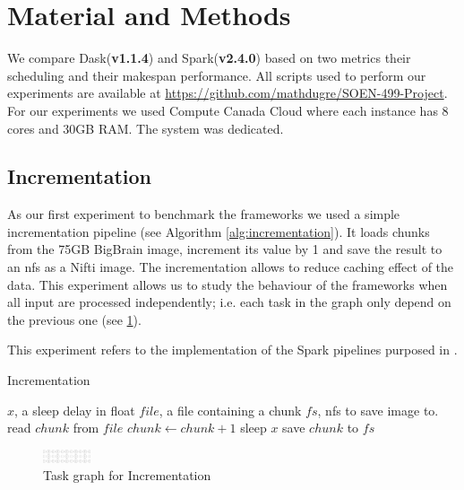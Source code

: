 \documentclass[11pt,a4paper]{article}
\begin{document}
\section{Material and Methods}
We compare Dask(\textbf{v1.1.4}) and Spark(\textbf{v2.4.0}) based on two metrics
their scheduling and their makespan performance. All scripts used to perform our
experiments are available at
\href{https://github.com/mathdugre/SOEN-499-Project}{https://github.com/mathdugre/SOEN-499-Project}.
For our experiments we used Compute Canada Cloud where each instance has 8 cores and
30GB RAM. The system was dedicated.
 
\subsection{Incrementation}
As our first experiment to benchmark the frameworks we used a simple incrementation
pipeline (see Algorithm \ref{alg:incrementation}). It loads chunks from the 75GB
BigBrain\citep{ds052:01} image, increment its value by 1 and save the result to an
nfs as a Nifti image. The incrementation allows to reduce caching effect of the data.
This experiment allows us to study the behaviour of the frameworks when all input are
processed independently; i.e. each task in the graph only depend on the previous one
(see \ref{fig:tg-inc}).

This experiment refers to the implementation of the Spark pipelines purposed in
\citet{Hayot-Sasson:17}.

\begin{algorithm}\caption{Incrementation}\label{alg:incrementation}
    \begin{algorithmic}
    \Require $x$, a sleep delay in float
    \Require $file$, a file containing a chunk
    \Require $fs$, nfs to save image to.
    \State read $chunk$ from $file$
        \State $chunk\gets chunk+1$
        \State sleep $x$
    \EndFor
    \EndFor
    \State save $chunk$ to $fs$
\end{algorithmic}
\end{algorithm}

\begin{figure}[ht]
    \centering
    \includegraphics[width=0.125\textwidth, angle=-90]{images/incrementation-task-graph.png}
    \caption{Task graph for Incrementation}
    \label{fig:tg-inc}
\end{figure}
\end{document}
